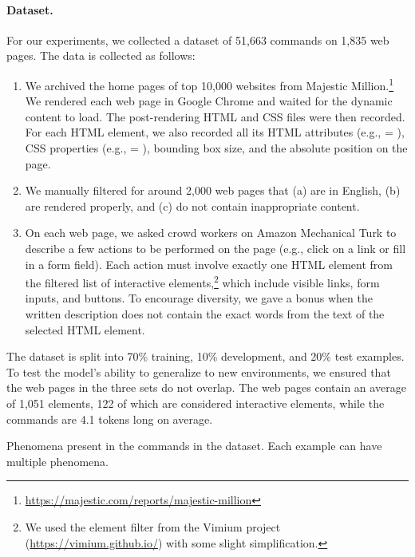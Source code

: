 \paragraph{Dataset.}
For our experiments,
we collected a dataset of 51,663 commands
on 1,835 web pages.
The data is collected as follows:
\begin{enumerate}
\item
We archived the home pages of top 10,000 websites
from Majestic Million.\footnote{\url{https://majestic.com/reports/majestic-million}}
We rendered each web page in Google Chrome
and waited for the dynamic content to load.
The post-rendering HTML and CSS files
were then recorded.
For each HTML element,
we also recorded all its HTML attributes
(e.g.,  = ),
CSS properties
(e.g.,  = ), bounding box size,
and the absolute position on the page.

\item
We manually filtered for around 2,000 web pages
that (a) are in English,
(b) are rendered properly,
and (c) do not contain inappropriate content.

\item
On each web page,
we asked crowd workers on Amazon Mechanical Turk
to describe a few actions to be performed on the page
(e.g., click on a link or fill in a form field).
Each action must involve exactly one HTML element
from the filtered list of interactive elements,\footnote{
We used the element filter from the Vimium project
(\url{https://vimium.github.io/})
with some slight simplification.}
which include visible links, form inputs, and buttons.
To encourage diversity,
we gave a bonus when the written description does not contain
the exact words from the text of the selected HTML element.

\end{enumerate}

The dataset is split into 70\% training,
10\% development, and 20\% test examples.
To test the model's ability to generalize to new environments,
we ensured that the web pages in the three sets do not overlap.
The web pages contain an average of 1,051 elements,
122 of which are considered interactive elements,
while the commands are 4.1 tokens long on average.

\begin{table}[t]
\centering

\caption[
Phenomena present in the dataset of mapping commands to web elements]{
Phenomena present in the commands in the dataset.
Each example can have multiple phenomena.}
\label{tab:webrep-phenomena}
\end{table}

